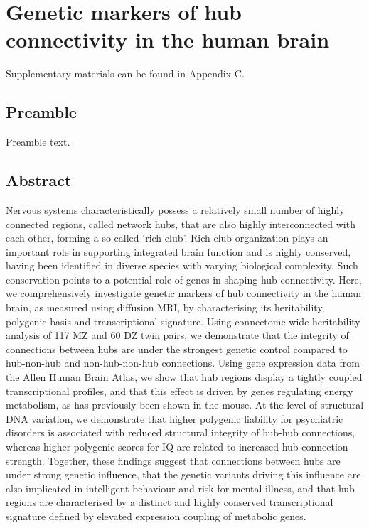\chapter{Genetic markers of hub connectivity in the human brain}
\label{ch:Chapter5}



Supplementary materials can be found in Appendix C.

\section*{Preamble}
Preamble text.

\newpage

\section*{Abstract}
Nervous systems characteristically possess a relatively small number of highly connected regions, called network hubs, that are also highly interconnected with each other, forming a so-called `rich-club’. Rich-club organization plays an important role in supporting integrated brain function and is highly conserved, having been identified in diverse species with varying biological complexity. Such conservation points to a potential role of genes in shaping hub connectivity. Here, we comprehensively investigate genetic markers of hub connectivity in the human brain, as measured using diffusion MRI, by characterising its heritability, polygenic basis and transcriptional signature. Using connectome-wide heritability analysis of 117 MZ and 60 DZ twin pairs, we demonstrate that the integrity of connections between hubs are under the strongest genetic control compared to hub-non-hub and non-hub-non-hub connections. Using gene expression data from the Allen Human Brain Atlas, we show that hub regions display a tightly coupled transcriptional profiles, and that this effect is driven by genes regulating energy metabolism, as has previously been shown in the mouse. At the level of structural DNA variation, we demonstrate that higher polygenic liability for psychiatric disorders is associated with reduced structural integrity of hub-hub connections, whereas higher polygenic scores for IQ are related to increased hub connection strength. Together, these findings suggest that connections between hubs are under strong genetic influence, that the genetic variants driving this influence are also implicated in intelligent behaviour and risk for mental illness, and that hub regions are characterised by a distinct and highly conserved transcriptional signature defined by elevated expression coupling of metabolic genes.

